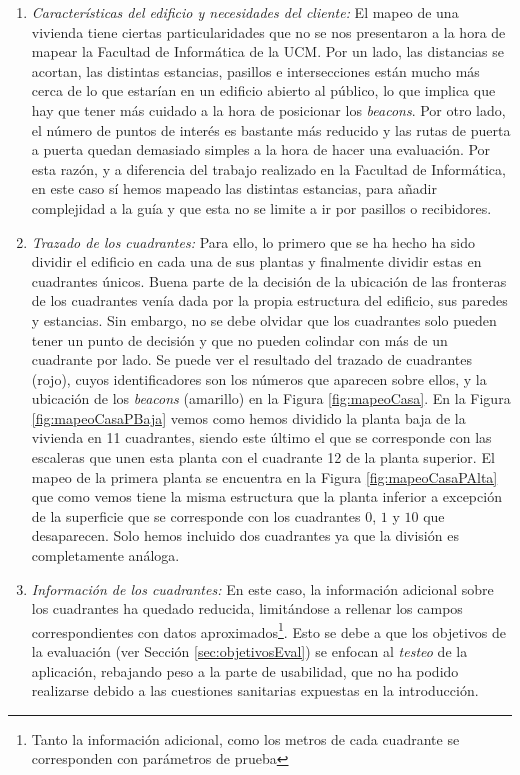 \begin{enumerate}
	\item \textit{Características del edificio y necesidades del cliente:} El mapeo de una vivienda tiene ciertas particularidades que no se nos presentaron a la hora de mapear la Facultad de Informática de la UCM. Por un lado, las distancias se acortan, las distintas estancias, pasillos e intersecciones están mucho más cerca de lo que estarían en un edificio abierto al público, lo que implica que hay que tener más cuidado a la hora de posicionar los \textit{beacons}. Por otro lado, el número de puntos de interés es bastante más reducido y las rutas de puerta a puerta quedan demasiado simples a la hora de hacer una evaluación. Por esta razón, y a diferencia del trabajo realizado en la Facultad de Informática, en este caso sí hemos mapeado las distintas estancias, para añadir complejidad a la guía y que esta no se limite a ir por pasillos o recibidores.
	
	\item \textit{Trazado de los cuadrantes:} Para ello, lo primero que se ha hecho ha sido dividir el edificio en cada una de sus plantas y finalmente dividir estas en cuadrantes únicos. Buena parte de la decisión de la ubicación de las fronteras de los cuadrantes venía dada por la propia estructura del edificio, sus paredes y estancias. Sin embargo, no se debe olvidar que los cuadrantes solo pueden tener un punto de decisión y que no pueden colindar con más de un cuadrante por lado. Se puede ver el resultado del trazado de cuadrantes (rojo), cuyos identificadores son los números que aparecen sobre ellos, y la ubicación de los \textit{beacons} (amarillo) en la Figura \ref{fig:mapeoCasa}. En la Figura \ref{fig:mapeoCasaPBaja} vemos como hemos dividido la planta baja de la vivienda en 11 cuadrantes, siendo este último el que se corresponde con las escaleras que unen esta planta con el cuadrante 12 de la planta superior. El mapeo de la primera planta se encuentra en la Figura \ref{fig:mapeoCasaPAlta} que como vemos tiene la misma estructura que la planta inferior a excepción de la superficie que se corresponde con los cuadrantes $0$, $1$ y $10$ que desaparecen. Solo hemos incluido dos cuadrantes ya que la división es completamente análoga.	
	
	\item \textit{Información de los cuadrantes:} En este caso, la información adicional sobre los cuadrantes ha quedado reducida, limitándose a rellenar los campos correspondientes con datos aproximados\footnote{Tanto la información adicional, como los metros de cada cuadrante se corresponden con parámetros de prueba}. Esto se debe a que los objetivos de la evaluación (ver Sección \ref{sec:objetivosEval}) se enfocan al \textit{testeo} de la aplicación, rebajando peso a la parte de usabilidad, que no ha podido realizarse debido a las cuestiones sanitarias expuestas en la introducción. 
	

\end{enumerate}
